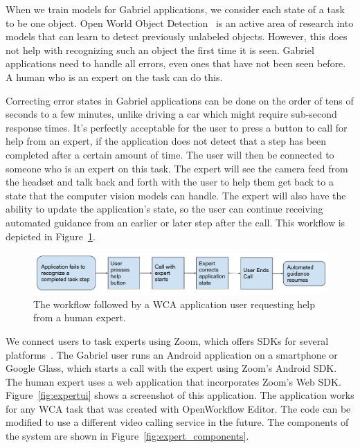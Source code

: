 When we train models for Gabriel applications, we consider each state of a task
to be one object. Open World Object Detection~\cite{joseph2021open} is an active
area of research into models that can learn to detect previously unlabeled
objects. However, this does not help with recognizing such an object the first
time it is seen. Gabriel applications need to handle all errors, even ones that
have not been seen before. A human who is an expert on the task can do this.

Correcting error states in Gabriel applications can be done on the order of tens
of seconds to a few
minutes, unlike driving a car which might require sub-second response times.
It's perfectly acceptable for the user to press a button to call for help from
an expert, if the application does not detect that a step has been completed
after a certain amount of time. The user will then be connected to someone who
is an expert on this task. The expert will
see the camera feed from the headset and talk back and forth with the user to
help them get back to a state that the computer vision models can handle.
The expert will also have the ability to update the application's state, so the
user can continue receiving automated guidance from an earlier or later
step after the call.
This workflow is depicted in Figure~\ref{fig:zoom_workflow}.

\begin{figure}[h]
  \includegraphics[width=\textwidth]{figures/zoom_workflow.pdf}
  \caption{The workflow followed by a WCA application user requesting help from
    a human expert.
  }\label{fig:zoom_workflow}
\end{figure}

We connect users to task experts using Zoom, which offers SDKs for several
platforms~\cite{Zoom}. The Gabriel user runs an Android application on a
smartphone or Google Glass, which starts a call with the expert using Zoom's
Android SDK.
The human expert uses a web application that incorporates Zoom's Web SDK.
Figure~\ref{fig:expertui} shows a screenshot of this application.
The application works for any WCA task that was created with OpenWorkflow
Editor.
The code can
be modified to use a different video calling service in the future.
The components of the system are shown in Figure~\ref{fig:expert_components}.

